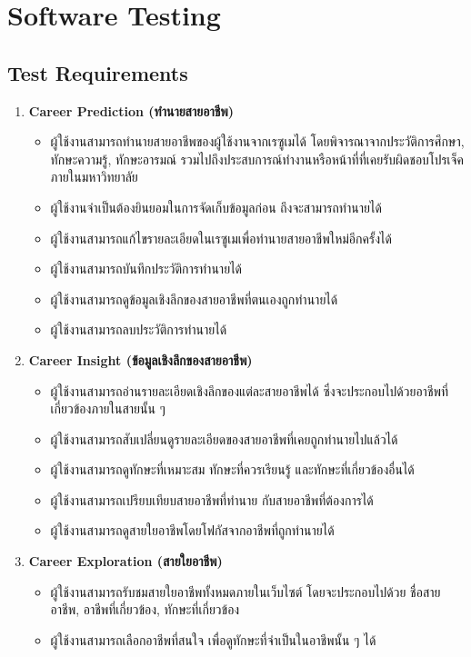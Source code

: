 \section{Software Testing}
\subsection{Test Requirements}
\begin{enumerate}
    \item \textbf{Career Prediction (ทำนายสายอาชีพ)}
          \begin{itemize}
              \item ผู้ใช้งานสามารถทำนายสายอาชีพของผู้ใช้งานจากเรซูเมได้ โดยพิจารณาจากประวัติการศึกษา, ทักษะความรู้, ทักษะอารมณ์ รวมไปถึงประสบการณ์ทำงานหรือหน้าที่ที่เคยรับผิดชอบโปรเจ็คภายในมหาวิทยาลัย
              \item ผู้ใช้งานจำเป็นต้องยินยอมในการจัดเก็บข้อมูลก่อน ถึงจะสามารถทำนายได้
              \item ผู้ใช้งานสามารถแก้ไขรายละเอียดในเรซูเมเพื่อทำนายสายอาชีพใหม่อีกครั้งได้
              \item ผู้ใช้งานสามารถบันทึกประวัติการทำนายได้
              \item ผู้ใช้งานสามารถดูข้อมูลเชิงลึกของสายอาชีพที่ตนเองถูกทำนายได้
              \item ผู้ใช้งานสามารถลบประวัติการทำนายได้
          \end{itemize}
    \item \textbf{Career Insight (ข้อมูลเชิงลึกของสายอาชีพ)}
          \begin{itemize}
              \item ผู้ใช้งานสามารถอ่านรายละเอียดเชิงลึกของแต่ละสายอาชีพได้ ซึ่งจะประกอบไปด้วยอาชีพที่เกี่ยวข้องภายในสายนั้น ๆ
              \item ผู้ใช้งานสามารถสับเปลี่ยนดูรายละเอียดของสายอาชีพที่เคยถูกทำนายไปแล้วได้
              \item ผู้ใช้งานสามารถดูทักษะที่เหมาะสม ทักษะที่ควรเรียนรู้ และทักษะที่เกี่ยวข้องอื่นได้
              \item ผู้ใช้งานสามารถเปรียบเทียบสายอาชีพที่ทำนาย กับสายอาชีพที่ต้องการได้
              \item ผู้ใช้งานสามารถดูสายใยอาชีพโดยโฟกัสจากอาชีพที่ถูกทำนายได้
          \end{itemize}
    \item \textbf{Career Exploration (สายใยอาชีพ)}
          \begin{itemize}
              \item ผู้ใช้งานสามารถรับชมสายใยอาชีพทั้งหมดภายในเว็บไซต์ โดยจะประกอบไปด้วย ชื่อสายอาชีพ, อาชีพที่เกี่ยวข้อง, ทักษะที่เกี่ยวข้อง
              \item ผู้ใช้งานสามารถเลือกอาชีพที่สนใจ เพื่อดูทักษะที่จำเป็นในอาชีพนั้น ๆ ได้
          \end{itemize}
\end{enumerate}
\label{sec:test-subsection}
